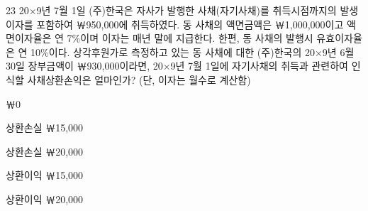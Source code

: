 \begin{question}{23}
20×9년 7월 1일 (주)한국은 자사가 발행한 사채(자기사채)를 취득시점까지의 발생이자를 포함하여 ￦950,000에 취득하였다. 동 사채의 액면금액은 ￦1,000,000이고 액면이자율은 연 7\%이며 이자는 매년 말에 지급한다. 한편, 동 사채의 발행시 유효이자율은 연 10\%이다. 상각후원가로 측정하고 있는 동 사채에 대한 (주)한국의 20×9년 6월 30일 장부금액이 ￦930,000이라면, 20×9년 7월 1일에 자기사채의 취득과 관련하여 인식할 사채상환손익은 얼마인가? (단, 이자는 월수로 계산함)
\begin{choices}
  \item ￦0
  \item 상환손실 ￦15,000
  \item 상환손실 ￦20,000
  \item 상환이익 ￦15,000
  \item 상환이익 ￦20,000
\end{choices}
\end{question}

